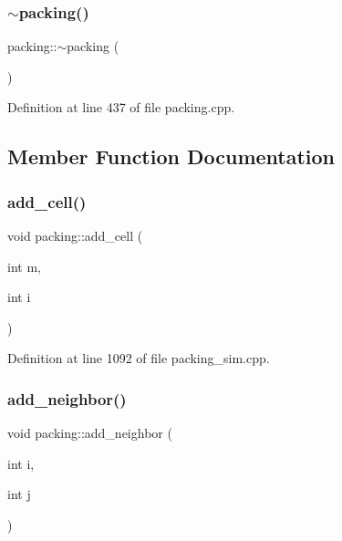 \subsubsection{\texorpdfstring{$\sim$packing()}{~packing()}}
{\footnotesize\ttfamily packing\+::$\sim$packing (\begin{DoxyParamCaption}{ }\end{DoxyParamCaption})}



Definition at line 437 of file packing.\+cpp.



\subsection{Member Function Documentation}
\mbox{\label{classpacking_a433ee4f918ce8124cc4dc24a29dcbe1c}} 
\subsubsection{\texorpdfstring{add\+\_\+cell()}{add\_cell()}}
{\footnotesize\ttfamily void packing\+::add\+\_\+cell (\begin{DoxyParamCaption}\item[{int}]{m,  }\item[{int}]{i }\end{DoxyParamCaption})}



Definition at line 1092 of file packing\+\_\+sim.\+cpp.

\mbox{\label{classpacking_a9a47d7d55eb9fa7a4083571fc2a9b78f}} 
\subsubsection{\texorpdfstring{add\+\_\+neighbor()}{add\_neighbor()}}
{\footnotesize\ttfamily void packing\+::add\+\_\+neighbor (\begin{DoxyParamCaption}\item[{int}]{i,  }\item[{int}]{j }\end{DoxyParamCaption})}



